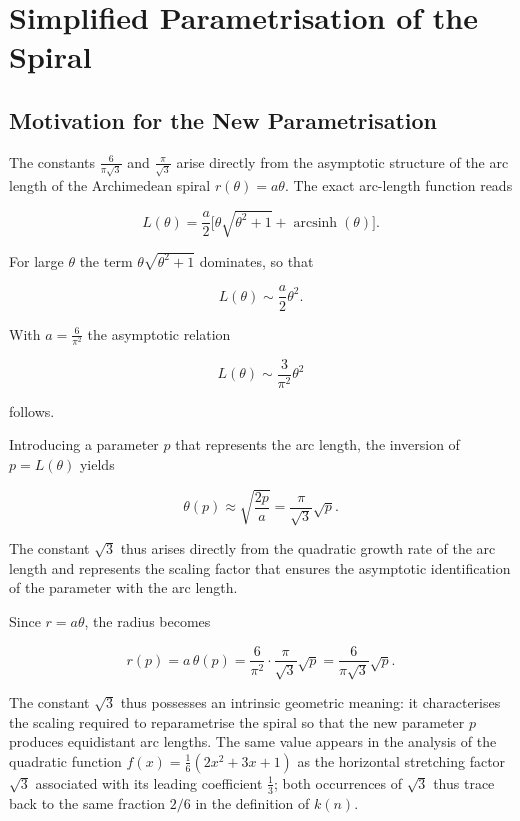 \chapter{Simplified Parametrisation of the Spiral}
\label{sec:parametrisierung}
\section{Motivation for the New Parametrisation}
The constants \(\frac{6}{\pi\sqrt{3}}\) and \(\frac{\pi}{\sqrt{3}}\) arise
directly from the asymptotic structure of the arc length of the Archimedean spiral
\(r(\theta)=a\theta\). The exact arc-length function reads


\[
L(\theta)=\frac{a}{2}\bigl[\theta\sqrt{\theta^{2}+1}+\operatorname{arcsinh}(\theta)\bigr].
\]


For large \(\theta\) the term \(\theta\sqrt{\theta^{2}+1}\) dominates, so that


\[
L(\theta)\sim \frac{a}{2}\theta^{2}.
\]


With \(a=\frac{6}{\pi^{2}}\) the asymptotic relation


\[
L(\theta)\sim \frac{3}{\pi^{2}}\theta^{2}
\]


follows.

Introducing a parameter \(p\) that represents the arc length, the inversion
of \(p=L(\theta)\) yields


\[
\theta(p)\approx \sqrt{\frac{2p}{a}}
= \frac{\pi}{\sqrt{3}}\sqrt{p}.
\]


The constant \(\sqrt{3}\) thus arises directly from the quadratic
growth rate of the arc length and represents the scaling factor that
ensures the asymptotic identification of the parameter with the arc length.

Since \(r=a\theta\), the radius becomes


\[
r(p)=a\,\theta(p)
= \frac{6}{\pi^{2}}\cdot\frac{\pi}{\sqrt{3}}\sqrt{p}
= \frac{6}{\pi\sqrt{3}}\sqrt{p}.
\]



The constant \(\sqrt{3}\) thus possesses an intrinsic geometric meaning:
it characterises the scaling required to reparametrise the
spiral so that the new parameter \(p\) produces equidistant arc lengths.
The same value appears in the analysis of the quadratic function $f(x) = \tfrac{1}{6}(2x^2+3x+1)$ as the horizontal stretching factor $\sqrt{3}$ associated with its leading coefficient $\tfrac13$; both occurrences of $\sqrt{3}$ thus trace back to the same fraction $2/6$ in the definition of $k(n)$.


